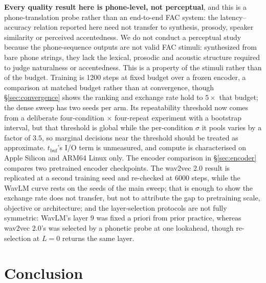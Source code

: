 \documentclass[journal]{IEEEtran}
\newcommand{\tbuf}{\ensuremath{t_{\mathrm{buf}}}}
\begin{document}
\textbf{Every quality result here is phone-level, not perceptual}, and this is
a phone-translation probe rather than an end-to-end FAC system: the
latency--accuracy relation reported here need not transfer to synthesis,
prosody, speaker similarity or perceived accentedness. We do not conduct a perceptual
study because the phone-sequence outputs are not valid FAC stimuli: synthesized
from bare phone strings, they lack the lexical, prosodic and acoustic structure
required to judge naturalness or accentedness. This is a property of the
stimuli rather than of the budget. Training is 1200 steps at fixed budget
over a frozen encoder, a comparison at matched budget rather than at
convergence, though \S\ref{sec:convergence} shows the ranking and exchange
rate hold to $5\times$ that budget; the dense sweep has two
seeds per arm. Its repeatability threshold now comes from a deliberate
four-condition $\times$ four-repeat experiment with a bootstrap interval, but
that threshold is global while the per-condition $\sigma$ it pools varies by a
factor of $3.5$, so marginal decisions near the threshold should be treated as
approximate. \tbuf{}'s I/O term is unmeasured, and compute is characterised on Apple
Silicon and ARM64 Linux only. The encoder comparison in
\S\ref{sec:encoder} compares two pretrained encoder checkpoints. The wav2vec
2.0 result is replicated at a second training seed and re-checked at 6000
steps, while the WavLM curve rests on the seeds of the main sweep; that is
enough to show the exchange rate does not transfer, but not to attribute the
gap to pretraining scale, objective or architecture; and the layer-selection protocols are not
fully symmetric: WavLM's layer 9 was fixed a priori from prior practice,
whereas wav2vec 2.0's was selected by a phonetic probe at one lookahead, though
re-selection at $L{=}0$ returns the same layer.

\section{Conclusion}
\end{document}
